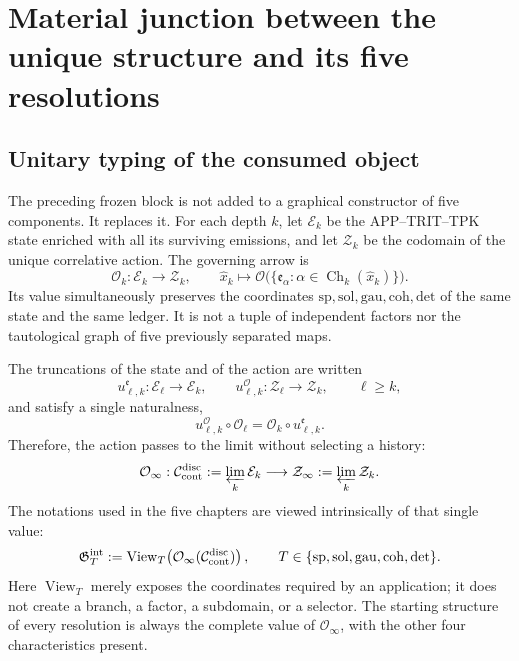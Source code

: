 \chapter{Material junction between the unique structure and its five resolutions}
\label{chap:pdf2-generacion-simultanea-hmt}

\begingroup
\footnotesize

\endgroup

\section{Unitary typing of the consumed object}

The preceding frozen block is not added to a graphical constructor of five
components. It replaces it. For each depth \(k\), let
\(\mathcal E_k\) be the APP--TRIT--TPK state enriched with all its surviving
emissions, and let \(\mathcal Z_k\) be the codomain of the unique correlative
action. The governing arrow is
\begin{equation}\label{eq:pdf2-constructor-unico-operaciones}
 \mathcal O_k:\mathcal E_k\longrightarrow\mathcal Z_k,
 \qquad
 \widehat x_k\longmapsto
 \mathcal O\bigl(\{\mathfrak e_\alpha:
 \alpha\in\operatorname{Ch}_k(\widehat x_k)\}\bigr).
\end{equation}
Its value simultaneously preserves the coordinates
\(\mathrm{sp},\mathrm{sol},\mathrm{gau},\mathrm{coh},\mathrm{det}\)
of the same state and the same ledger. It is not a tuple of independent
factors nor the tautological graph of five previously separated maps.

The truncations of the state and of the action are written
\[
 u^{\mathfrak e}_{\ell,k}:\mathcal E_\ell\to\mathcal E_k,
 \qquad
 u^{\mathcal O}_{\ell,k}:\mathcal Z_\ell\to\mathcal Z_k,
 \qquad \ell\ge k,
\]
and satisfy a single naturalness,
\begin{equation}\label{eq:pdf2-naturalidad-accion-unica}
 u^{\mathcal O}_{\ell,k}\circ\mathcal O_\ell
 =\mathcal O_k\circ u^{\mathfrak e}_{\ell,k}.
\end{equation}
Therefore, the action passes to the limit without selecting a history:
\[
 \mathcal O_\infty:
 \mathcal C_{\rm cont}^{\rm disc}:=\varprojlim_k\mathcal E_k
 \longrightarrow
 \mathcal Z_\infty:=\varprojlim_k\mathcal Z_k.
\]
The notations used in the five chapters are viewed intrinsically of that
single value:
\begin{equation}\label{eq:pdf2-operacion-infinita-tipificada}
 \mathfrak G_T^{\rm int}
 :=\operatorname{View}_T\!\left(
 \mathcal O_\infty(\mathcal C_{\rm cont}^{\rm disc})\right),
 \qquad
 T\in\{\mathrm{sp},\mathrm{sol},\mathrm{gau},\mathrm{coh},\mathrm{det}\}.
\end{equation}
Here \(\operatorname{View}_T\) merely exposes the coordinates required by an
application; it does not create a branch, a factor, a subdomain, or a selector. The
starting structure of every resolution is always the complete value of
\(\mathcal O_\infty\), with the other four characteristics present.

